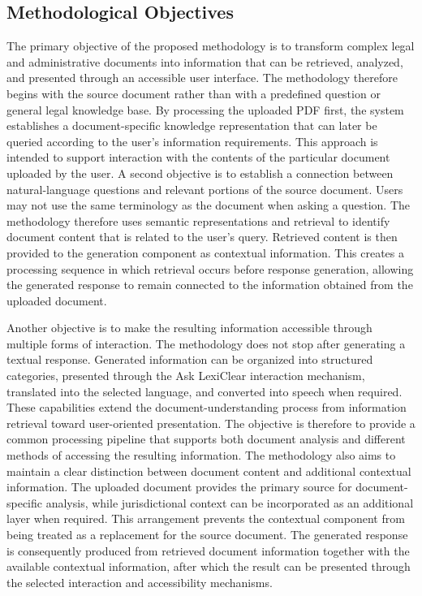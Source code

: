\documentclass[12pt,a4paper,oneside]{report}
\begin{document}
\subsection{Methodological Objectives}

The primary objective of the proposed methodology is to transform complex
legal and administrative documents into information that can be retrieved,
analyzed, and presented through an accessible user interface. The methodology
therefore begins with the source document rather than with a predefined
question or general legal knowledge base. By processing the uploaded PDF
first, the system establishes a document-specific knowledge representation
that can later be queried according to the user's information requirements.
This approach is intended to support interaction with the contents of the
particular document uploaded by the user. A second objective is to establish a connection between natural-language
questions and relevant portions of the source document. Users may not use
the same terminology as the document when asking a question. The methodology
therefore uses semantic representations and retrieval to identify document
content that is related to the user's query. Retrieved content is then
provided to the generation component as contextual information. This creates
a processing sequence in which retrieval occurs before response generation,
allowing the generated response to remain connected to the information
obtained from the uploaded document.

Another objective is to make the resulting information accessible through
multiple forms of interaction. The methodology does not stop after generating
a textual response. Generated information can be organized into structured
categories, presented through the Ask LexiClear interaction mechanism,
translated into the selected language, and converted into speech when
required. These capabilities extend the document-understanding process from
information retrieval toward user-oriented presentation. The objective is
therefore to provide a common processing pipeline that supports both
document analysis and different methods of accessing the resulting
information. The methodology also aims to maintain a clear distinction between document
content and additional contextual information. The uploaded document
provides the primary source for document-specific analysis, while
jurisdictional context can be incorporated as an additional layer when
required. This arrangement prevents the contextual component from being
treated as a replacement for the source document. The generated response
is consequently produced from retrieved document information together with
the available contextual information, after which the result can be
presented through the selected interaction and accessibility mechanisms.
\end{document}
